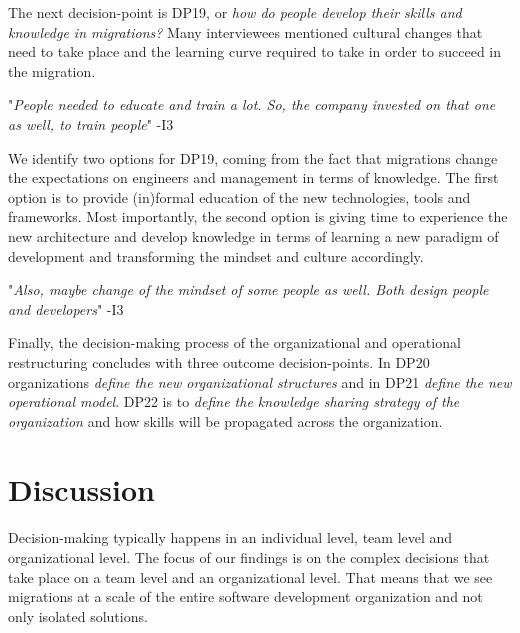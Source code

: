 \documentclass[sigconf,dvipsnames]{acmart}
\newcommand{\interviewquote}[2]{
 \def\FrameCommand{%
    \hspace{0pt}%
    {\color{MidnightBlue}\vrule width 1.5pt}%
    {\color{white}\vrule width 4pt}%
    \colorbox{white}
  }%
  \MakeFramed{\advance\hsize-\width\FrameRestore}%
  \noindent\hspace{-4.55pt}%
  \footnotesize{"\emph{#1}" -{#2}}\vspace{0.5pt}\endMakeFramed%
}
\begin{document}
The next decision-point is DP19, or \emph{how do people develop their skills and knowledge in migrations?}
Many interviewees mentioned cultural changes that need to take place and the learning curve required to take in order to succeed in the migration. 
\interviewquote{People needed to educate and train a lot. So, the company invested on that one as well, to train people}{I3}
We identify two options for DP19, coming from the fact that migrations change the expectations on engineers and management in terms of knowledge.
The first option is to provide (in)formal education of the new technologies, tools and frameworks.
Most importantly, the second option is giving time to experience the new architecture and develop knowledge in terms of learning a new paradigm of development and transforming the mindset and culture accordingly.
    \interviewquote{Also, maybe change of the mindset of some people as well. Both design people and developers}{I3}

Finally, the decision-making process of the organizational and operational restructuring concludes with three outcome decision-points. In DP20 organizations \emph{define the new organizational structures} and in DP21 \emph{define the new operational model}. DP22 is to \emph{define the knowledge sharing strategy of the organization} and how skills will be propagated across the organization.

\section{Discussion}

Decision-making typically happens in an individual level, team level and organizational level. The focus of our findings is on the complex decisions that take place on a team level and an organizational level. That means that we see migrations at a scale of the entire software development organization and not only isolated solutions. 
\end{document}
